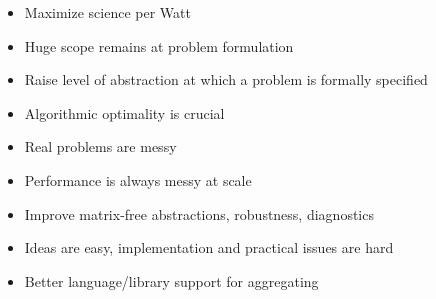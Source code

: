 \documentclass{beamer}
\begin{document}
\begin{frame}\large
  \begin{itemize}
  \item Maximize science per Watt
  \item Huge scope remains at problem formulation
  \item Raise level of abstraction at which a problem is formally specified
  \item Algorithmic optimality is crucial
  \item Real problems are messy
  \item Performance is always messy at scale
  \item Improve matrix-free abstractions, robustness, diagnostics
  \item Ideas are easy, implementation and practical issues are hard
  \item Better language/library support for aggregating
  \end{itemize}
\end{frame}
\end{document}
